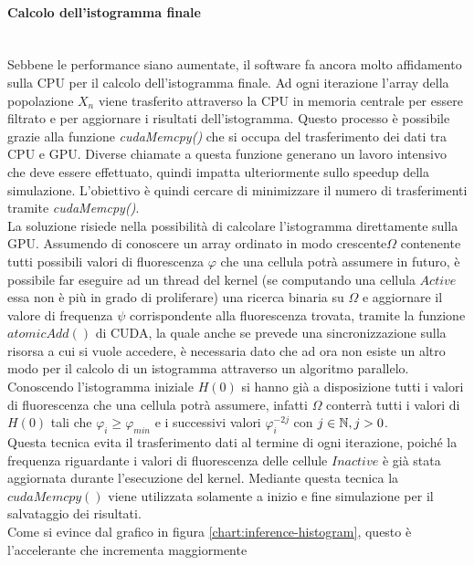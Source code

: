 \paragraph{Calcolo dell'istogramma finale}\mbox{}
\\
Sebbene le performance siano aumentate, il software fa ancora molto affidamento
sulla CPU per il calcolo dell'istogramma finale.
Ad ogni iterazione l'array della popolazione $X_{n}$ viene trasferito
attraverso la CPU in memoria centrale per essere filtrato e per aggiornare i
risultati dell'istogramma. Questo processo è possibile grazie alla funzione
\textit{cudaMemcpy()} che si occupa del trasferimento dei dati tra CPU e GPU.
Diverse chiamate a questa funzione generano un lavoro intensivo che deve essere
effettuato, quindi impatta ulteriormente sullo speedup della simulazione.
L'obiettivo è quindi cercare di minimizzare il numero di trasferimenti tramite
\textit{cudaMemcpy()}.
\\
La soluzione risiede nella possibilità di calcolare l'istogramma direttamente
sulla GPU. Assumendo di conoscere un array ordinato in modo crescente$\Omega$
contenente tutti possibili valori di fluorescenza
$\varphi$ che una cellula potrà assumere in futuro, è possibile far eseguire
ad un thread del kernel (se computando una cellula $Active$ essa non è più in
grado di proliferare) una ricerca binaria su $\Omega$ e aggiornare
il valore di frequenza $\psi$ corrispondente alla fluorescenza trovata, tramite
la funzione $atomicAdd()$ di CUDA, la quale anche se prevede una
sincronizzazione sulla risorsa a cui si vuole accedere, è necessaria dato che
ad ora non esiste un altro modo per il calcolo di un istogramma attraverso un
algoritmo parallelo.
\\
Conoscendo l'istogramma iniziale $H(0)$ si hanno già a disposizione
tutti i valori di fluorescenza che una cellula potrà assumere, infatti
$\Omega$ conterrà tutti i valori di $H(0)$ tali che $\varphi_{i} \geqslant
\varphi_{min}$ e i successivi valori $\varphi_{i}^{-2j}$ con $j \in \mathbb{N}, j > 0$.
\\
Questa tecnica evita il trasferimento dati al termine di ogni iterazione, poiché
la frequenza riguardante i valori di fluorescenza delle cellule $Inactive$
è già stata aggiornata durante l'esecuzione del kernel.
Mediante questa tecnica la $cudaMemcpy()$ viene utilizzata solamente a inizio
e fine simulazione per il salvataggio dei risultati.
\\
Come si evince dal grafico in figura \ref{chart:inference-histogram}, 
questo è l'accelerante che incrementa maggiormente

